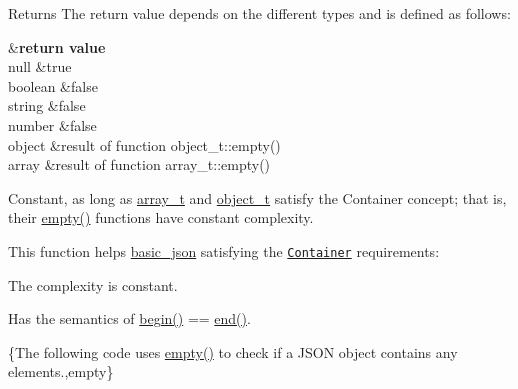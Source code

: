 \begin{DoxyReturn}{Returns}
The return value depends on the different types and is defined as follows\-: \begin{TabularC}{2}
\hline
{}&{\bf return value  }\\
null &{\ttfamily true} \\
boolean &{\ttfamily false} \\
string &{\ttfamily false} \\
number &{\ttfamily false} \\
object &result of function {\ttfamily object\-\_\-t\-::empty()} \\
array &result of function {\ttfamily array\-\_\-t\-::empty()} \\
\end{TabularC}
Constant, as long as \hyperlink{classnlohmann_1_1basic__json_ab00b882d39306d663c23dab110f5cae0}{array\-\_\-t} and \hyperlink{classnlohmann_1_1basic__json_a0ac9894c9de8dc551cf2e5f1c605537f}{object\-\_\-t} satisfy the Container concept; that is, their {\ttfamily \hyperlink{classnlohmann_1_1basic__json_ae3fe0423252e171973cdd5786d036e30}{empty()}} functions have constant complexity.
\end{DoxyReturn}
This function helps {\ttfamily \hyperlink{classnlohmann_1_1basic__json}{basic\-\_\-json}} satisfying the \href{http://en.cppreference.com/w/cpp/concept/Container}{\tt Container} requirements\-:
\begin{DoxyItemize}
\item The complexity is constant.
\item Has the semantics of {\ttfamily \hyperlink{classnlohmann_1_1basic__json_ad4e381c54039607be08d7af41a1f6ad1}{begin()} == \hyperlink{classnlohmann_1_1basic__json_a12ccf14d39ddae52f6c7e126105a230b}{end()}}.
\end{DoxyItemize}

\{The following code uses {\ttfamily \hyperlink{classnlohmann_1_1basic__json_ae3fe0423252e171973cdd5786d036e30}{empty()}} to check if a J\-S\-O\-N object contains any elements.,empty\}

